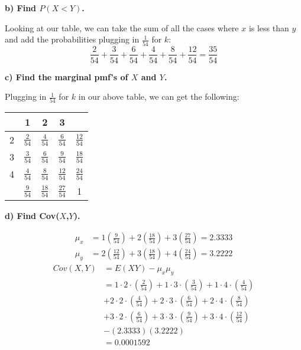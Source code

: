 \documentclass[12pt, letter]{article}
\begin{document}
\qquad \textbf{b) Find $P(X < Y)$.}
\begin{center}
	Looking at our table, we can take the sum of all the cases where $x$ is less than $y$ and add the probabilities plugging in $\frac{1}{54}$ for $k$:
	$$\frac{2}{54} + \frac{3}{54} + \frac{6}{54} + \frac{4}{54} + \frac{8}{54} + \frac{12}{54} = \boxed{\frac{35}{54}}$$
\end{center}

\pagebreak

\qquad \textbf{c) Find the marginal pmf’s of $X$ and $Y$.}
\begin{center}
	Plugging in $\frac{1}{54}$ for $k$ in our above table, we can get the following:
	\newline
	\newline
	\def\arraystretch{1.5}
	\begin{tabular}{c|ccc|c}
		\backslashbox{$y$}{$x$} & 1 & 2 & 3 & \\
		\hline
		2 & $\frac{2}{54}$ & $\frac{4}{54}$ & $\frac{6}{54}$ & $\frac{12}{54}$ \\
		3 & $\frac{3}{54}$ & $\frac{6}{54}$ & $\frac{9}{54}$ & $\frac{18}{54}$ \\
		4 & $\frac{4}{54}$ & $\frac{8}{54}$ & $\frac{12}{54}$ & $\frac{24}{54}$ \\
		\hline
		& $\frac{9}{54}$ & $\frac{18}{54}$ & $\frac{27}{54}$ & 1
	\end{tabular}
\end{center}

\qquad \textbf{d) Find Cov($X$,$Y$).}
\begin{center}
	\begin{align*}
		\mu_{x} &= 1\left(\frac{9}{54}\right) + 2\left(\frac{18}{54}\right) + 3\left(\frac{27}{54}\right) = 2.3333 \\
		\mu_{y} &= 2\left(\frac{12}{54}\right) + 3\left(\frac{18}{54}\right) + 4\left(\frac{24}{54}\right) = 3.2222
	\end{align*}
	\begin{align*}
		Cov(X,Y) &= E(XY) - \mu_{x} \mu_{y} \\
		&= 1 \cdot 2 \cdot \left(\frac{2}{54}\right) + 1 \cdot 3 \cdot \left(\frac{3}{54}\right) + 1 \cdot 4 \cdot \left(\frac{4}{54}\right) \\
		&+ 2 \cdot 2 \cdot \left(\frac{4}{54}\right) + 2 \cdot 3 \cdot \left(\frac{6}{54}\right) + 2 \cdot 4 \cdot \left(\frac{8}{54}\right) \\
		&+ 3 \cdot 2 \cdot \left(\frac{6}{54}\right) + 3 \cdot 3 \cdot \left(\frac{9}{54}\right) + 3 \cdot 4 \cdot \left(\frac{12}{54}\right) \\
		&- (2.3333)(3.2222) \\
		&= \boxed{0.0001592}
	\end{align*}
\end{center}
\end{document}

